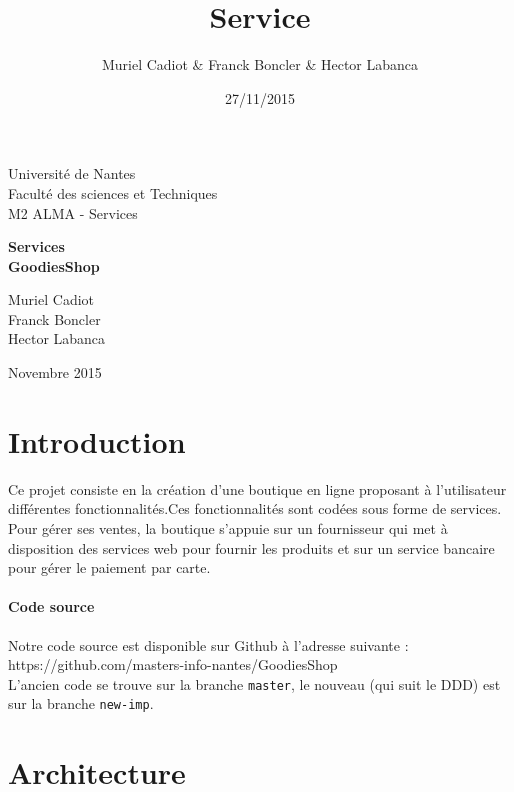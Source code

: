 \documentclass[a4paper,12pt]{article}
\title{Service}
\author{Muriel Cadiot & Franck Boncler & Hector Labanca}
\date{27/11/2015}
\begin{document}
\thispagestyle{empty}
{%
\sffamily
\centering
\Large
Université de Nantes\\
Faculté des sciences et Techniques\\
M2 ALMA - Services\\

\vspace{\fill}

{\huge 
\textbf{Services \\
\bigskip
GoodiesShop}
}

\vspace{4cm}

{\LARGE
Muriel Cadiot \\

Franck Boncler \\

Hector Labanca \\
}
\vspace{\fill}

Novembre 2015 
}%

\clearpage
%
%

{
\Large
\tableofcontents
}

\clearpage
\section{Introduction}
Ce projet consiste en la création d'une boutique en ligne proposant à l'utilisateur différentes fonctionnalités.Ces fonctionnalités sont codées sous forme de services. 
Pour gérer ses ventes, la boutique s’appuie sur un fournisseur qui met à disposition des services web pour fournir les produits et sur un service bancaire pour gérer le paiement par carte.
\paragraph{Code source}
Notre code source est disponible sur Github à l'adresse suivante :\\
https://github.com/masters-info-nantes/GoodiesShop\\
L'ancien code se trouve sur la branche \texttt{master}, le nouveau (qui suit le DDD) est sur la branche \texttt{new-imp}.

\section{Architecture}
\end{document}
